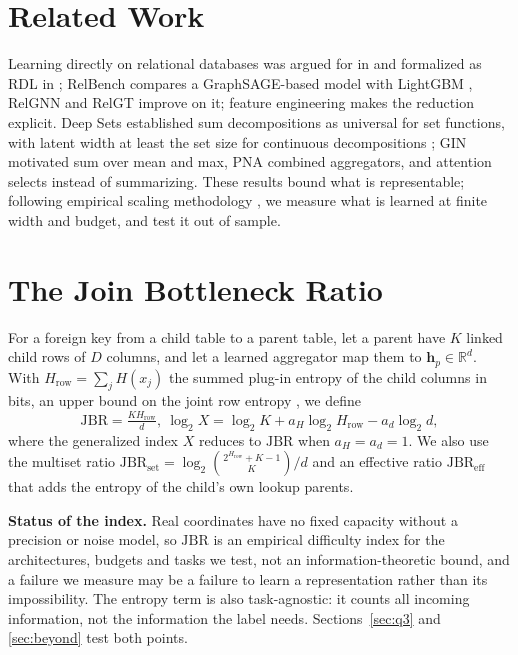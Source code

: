 \documentclass[conference]{IEEEtran}
\newcommand{\jbr}{\mathrm{JBR}}
\begin{document}
\section{Related Work}

Learning directly on relational databases was argued for in \cite{cvitkovic2020supervised} and formalized as RDL in \cite{fey2024relational}; RelBench \cite{robinson2024relbench} compares a GraphSAGE-based model \cite{hamilton2017graphsage} with LightGBM \cite{ke2017lightgbm}, RelGNN \cite{chen2025relgnn} and RelGT \cite{dwivedi2025relgt} improve on it; feature engineering \cite{kanter2015dfs} makes the reduction explicit. Deep Sets \cite{zaheer2017deepsets} established sum decompositions as universal for set functions, with latent width at least the set size for continuous decompositions \cite{wagstaff2019limitations,wagstaff2022universal}; GIN \cite{xu2019gin} motivated sum over mean and max, PNA \cite{corso2020pna} combined aggregators, and attention \cite{velickovic2018gat,brody2022gatv2,lee2019settransformer} selects instead of summarizing. These results bound what is representable; following empirical scaling methodology \cite{kaplan2020scaling}, we measure what is learned at finite width and budget, and test it out of sample.

\section{The Join Bottleneck Ratio}

For a foreign key from a child table to a parent table, let a parent have $K$ linked child rows of $D$ columns, and let a learned aggregator map them to $\mathbf{h}_p \in \mathbb{R}^d$. With $H_{\mathrm{row}} = \sum_j H(x_j)$ the summed plug-in entropy of the child columns in bits, an upper bound on the joint row entropy \cite{cover2006elements}, we define
\begin{equation}
\jbr = \tfrac{K H_{\mathrm{row}}}{d},\ \log_2 X = \log_2 K + a_H \log_2 H_{\mathrm{row}} - a_d \log_2 d,
\label{eq:jbr}
\end{equation}
where the generalized index $X$ reduces to $\jbr$ when $a_H = a_d = 1$. We also use the multiset ratio $\jbr_{\mathrm{set}} = \log_2\binom{2^{H_{\mathrm{row}}}+K-1}{K}/d$ and an effective ratio $\jbr_{\mathrm{eff}}$ that adds the entropy of the child's own lookup parents.

\textbf{Status of the index.} Real coordinates have no fixed capacity without a precision or noise model, so $\jbr$ is an empirical difficulty index for the architectures, budgets and tasks we test, not an information-theoretic bound, and a failure we measure may be a failure to learn a representation rather than its impossibility. The entropy term is also task-agnostic: it counts all incoming information, not the information the label needs. Sections~\ref{sec:q3} and \ref{sec:beyond} test both points.
\end{document}
